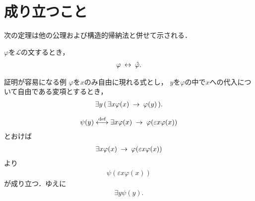 \section{成り立つこと}
	次の定理は他の公理および構造的帰納法と併せて示される．
	
	\begin{screen}
		\begin{thm}[書き換えの同値性]
			$\varphi$を$\mathcal{L}$の文するとき，
			\begin{align}
				\varphi \hspace{0.25em}\leftrightarrow\hspace{0.25em} \hat{\varphi}.
			\end{align}
		\end{thm}
	\end{screen}
	
\newpage
	\begin{itembox}[l]{証明が容易になる例}
		$\varphi$を$x$のみ自由に現れる式とし，
		$y$を$\varphi$の中で$x$への代入について自由である変項とするとき，
		\begin{align}
			\exists y\, (\, \exists x \varphi(x) \hspace{0.25em}\rightarrow\hspace{0.25em} \varphi(y)\, ).
		\end{align}
	\end{itembox}
	
	\begin{sketch}
		\begin{align}
			\psi(y) \overset{\mathrm{def}}{\longleftrightarrow} \exists x \varphi(x) \hspace{0.25em}\rightarrow\hspace{0.25em} \varphi(\varepsilon x \varphi(x))
		\end{align}
		とおけば
		\begin{align}
			\exists x \varphi(x) \hspace{0.25em}\rightarrow\hspace{0.25em} \varphi(\varepsilon x \varphi(x))
		\end{align}
		より
		\begin{align}
			\psi(\varepsilon x \varphi(x))
		\end{align}
		が成り立つ．ゆえに
		\begin{align}
			\exists y \psi(y).
		\end{align}
	\end{sketch}